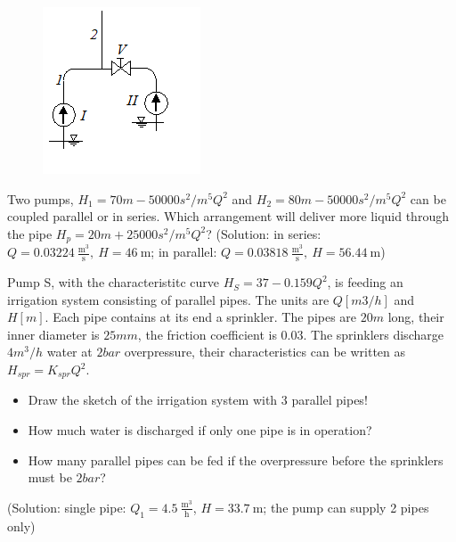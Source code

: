 \begin{figure}[!ht]
\centering
\includegraphics{Problem_solving/figs/PS_Control_Pumps.png}
\end{figure}

\vspace{1cm}

Two pumps, $H_1=70m-50000s^2/m^5Q^2$ and $H_2=80m-50000s^2/m^5Q^2$ can be coupled parallel or in series. Which arrangement will deliver more liquid through the pipe $H_p=20m+25000s^2/m^5Q^2$? (Solution: in series: $Q=0.03224~\frac{\mathrm{m^3}}{\mathrm{s}},~H=46~\mathrm{m}$; in parallel: $Q=0.03818~\frac{\mathrm{m^3}}{\mathrm{s}},~H=56.44~\mathrm{m}$)


\vspace{1cm}

Pump S, with the characteristitc curve $H_S=37-0.159Q^2$, is feeding an irrigation system consisting of parallel pipes. The units are $Q[m3/h]$ and $H[m]$. Each pipe contains at its end a sprinkler. The pipes are $20m$ long, their inner diameter is $25mm$, the friction coefficient is $0.03$. The sprinklers discharge $4 m^3/h$ water at $2 bar$ overpressure, their characteristics can be written as $H_{spr}=K_{spr}Q^2$. 

\begin{itemize}
\item Draw the sketch of the irrigation system with 3 parallel pipes!
\item How much water is discharged if only one pipe is in operation?
\item How many parallel pipes can be fed if the overpressure before the sprinklers must be $2 bar$? 
\end{itemize}

(Solution: single pipe: $Q_1 = 4.5~\frac{\mathrm{m^3}}{\mathrm{h}}$, $H=33.7~\mathrm{m}$; the pump can supply 2 pipes only)

